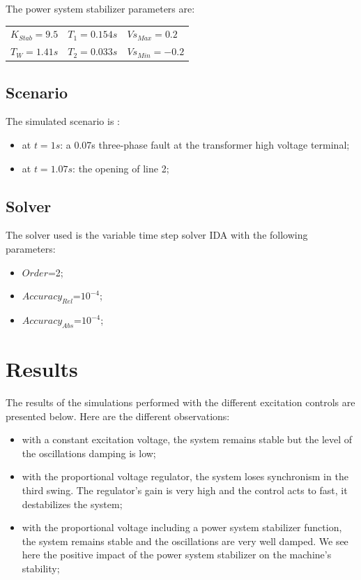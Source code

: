 \documentclass[a4paper, 12pt]{report}
\begin{document}
The power system stabilizer parameters are:
\begin{center}
\begin{tabular}{l|l|l}
   $K_{Stab}=9.5$ & $T_1=0.154s$ & $Vs_{Max}=0.2$  \\
   $T_W=1.41s$ & $T_2=0.033s$ & $Vs_{Min}=-0.2$   \\
\end{tabular}
\end{center}

\subsection{Scenario}
The simulated scenario is :
\begin{itemize}
\item at $t=1s$: a 0.07s three-phase fault at the transformer high voltage terminal;
\item at $t=1.07s$: the opening of line 2;
\end{itemize}

\subsection{Solver}
The solver used is the variable time step solver IDA with the following parameters:
\begin{itemize}
\item $Order$=2;
\item $Accuracy_{Rel}$=$10^{-4}$;
\item $Accuracy_{Abs}$=$10^{-4}$;
\end{itemize}

\section{Results}

The results of the simulations performed with the different excitation controls are presented below. Here are the different observations:
\begin{itemize}
\item with a constant excitation voltage, the system remains stable but the level of the oscillations damping is low;
\item with the proportional voltage regulator, the system loses synchronism in the third swing. The regulator's gain is very high and the control acts to fast, it destabilizes the system;
\item with the proportional voltage including a power system stabilizer function, the system remains stable and the oscillations are very well damped. We see here the positive impact of the power system stabilizer on the machine's stability;
\end{itemize}
\end{document}
